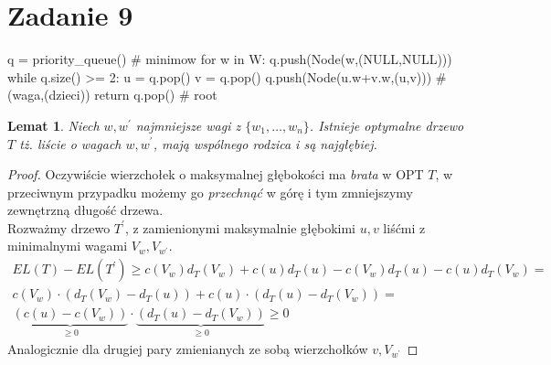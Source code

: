 \documentclass{article}
\newtheorem{lemma}{Lemat}
\begin{document}
\section{Zadanie 9}
\begin{python}
q = priority_queue() # minimow
for w in W:
    q.push(Node(w,(NULL,NULL)))
while q.size() >= 2:
    u = q.pop()
    v = q.pop()
    q.push(Node(u.w+v.w,(u,v))) # (waga,(dzieci))
return q.pop() # root
\end{python}
\begin{lemma}
Niech $w,w^\prime$ najmniejsze wagi z $\{w_1,\ldots,w_n\}$. Istnieje optymalne drzewo $T$ tż. liście o wagach $w,w^\prime$, mają wspólnego rodzica i są najgłębiej.
\end{lemma}
\begin{proof}
Oczywiście wierzchołek o maksymalnej głębokości ma \textit{brata} w OPT $T$, w przeciwnym przypadku możemy go \textit{przechnąć} w górę i tym zmniejszymy zewnętrzną długość drzewa.\\
Rozważmy drzewo $T^\prime$, z zamienionymi maksymalnie głębokimi $u,v$ liśćmi z minimalnymi wagami $V_{w}, V_{w^\prime}$.\\
\begin{align*}
EL(T) - EL(T^\prime) \geq c(V_w)d_T(V_w) + c(u)d_T(u) - c(V_w)d_T(u) - c(u)d_T(V_w) =\\
 c(V_{w})\cdot (d_T(V_w) - d_T(u)) + c(u)\cdot (d_T(u) - d_T(V_w)) = \\ \underbrace{(c(u) - c(V_w))}_{\geq 0} \cdot \underbrace{(d_T(u) - d_T(V_w))}_{\geq 0} \geq 0
\end{align*}
Analogicznie dla drugiej pary zmienianych ze sobą wierzchołków $v,V_{w^\prime}$
\end{proof}
\end{document}
